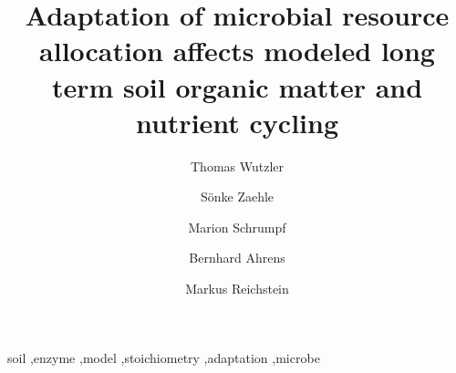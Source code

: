 \documentclass[authoryear,preprint,review,12pt]{elsarticle}
\begin{document}
\begin{frontmatter}



\title{Adaptation of microbial resource allocation affects modeled long term
soil organic matter and nutrient cycling}


\author[1]{Thomas Wutzler}
\author[1,2]{S\"onke Zaehle}
\author[1]{Marion Schrumpf}
\author[1]{Bernhard Ahrens}
\author[1,2]{Markus Reichstein}

\address[1]{Max Planck Institute for Biogeochemistry, Hans-Kn{\"o}ll-Stra{\ss}e 10,
07745 Jena, Germany }
\address[2]{Michael Stifel Center Jena for Data-driven and Simulation Science, Jena, Germany}

\begin{abstract}

\end{abstract}


\begin{keyword}
soil \sep  enzyme \sep  model \sep  stoichiometry \sep  adaptation \sep  microbe



\end{keyword}

\end{frontmatter}

\end{document}

